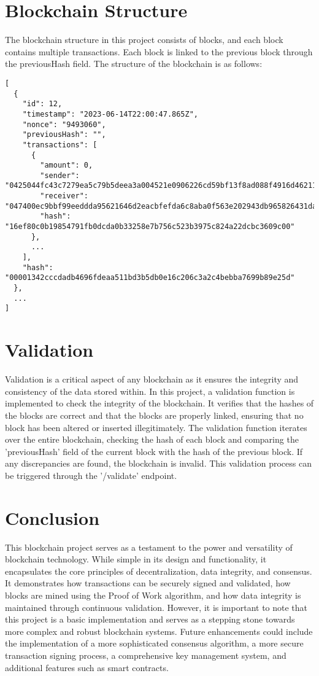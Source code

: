 \documentclass{article}
\begin{document}
\section{Blockchain Structure}
The blockchain structure in this project consists of blocks, and each block contains multiple transactions. Each block is linked to the previous block through the previousHash field. The structure of the blockchain is as follows:

\begin{lstlisting}
[
  {
    "id": 12,
    "timestamp": "2023-06-14T22:00:47.865Z",
    "nonce": "9493060",
    "previousHash": "",
    "transactions": [
      {
        "amount": 0,
        "sender": "0425044fc43c7279ea5c79b5deea3a004521e0906226cd59bf13f8ad088f4916d462117e50911e7b4c6f3b8fb89c6b899b6Ib6a189c95ea6677e2541d1fd81562880b",
        "receiver": "047400ec9bbf99eeddda95621646d2eacbfefda6c8aba0f563e202943db965826431da20e672585a7965c2b1c8db4051e7d822f329330058df52278b2eb1fee954",
        "hash": "16ef80c0b19854791fb0dcda0b33258e7b756c523b3975c824a22dcbc3609c00"
      },
      ...
    ],
    "hash": "00001342cccdadb4696fdeaa511bd3b5db0e16c206c3a2c4bebba7699b89e25d"
  },
  ...
]
\end{lstlisting}

\section{Validation}
Validation is a critical aspect of any blockchain as it ensures the integrity and consistency of the data stored within. In this project, a validation function is implemented to check the integrity of the blockchain. It verifies that the hashes of the blocks are correct and that the blocks are properly linked, ensuring that no block has been altered or inserted illegitimately. The validation function iterates over the entire blockchain, checking the hash of each block and comparing the 'previousHash' field of the current block with the hash of the previous block. If any discrepancies are found, the blockchain is invalid. This validation process can be triggered through the '/validate' endpoint.

\section{Conclusion}
This blockchain project serves as a testament to the power and versatility of blockchain technology. While simple in its design and functionality, it encapsulates the core principles of decentralization, data integrity, and consensus. It demonstrates how transactions can be securely signed and validated, how blocks are mined using the Proof of Work algorithm, and how data integrity is maintained through continuous validation. However, it is important to note that this project is a basic implementation and serves as a stepping stone towards more complex and robust blockchain systems. Future enhancements could include the implementation of a more sophisticated consensus algorithm, a more secure transaction signing process, a comprehensive key management system, and additional features such as smart contracts.
\end{document}
